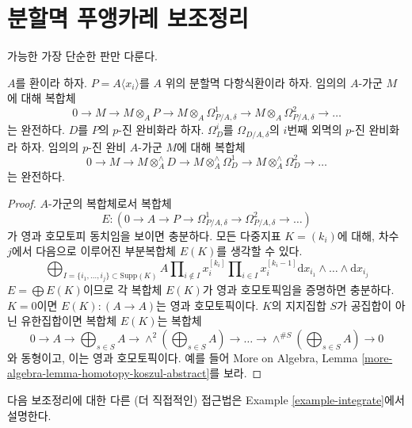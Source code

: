 \section{분할멱 푸앵카레 보조정리}
\label{section-poincare}

\noindent
가능한 가장 단순한 판만 다룬다.

\begin{lemma}
\label{lemma-poincare}
$A$를 환이라 하자. $P = A\langle x_i \rangle$를 $A$ 위의 분할멱
다항식환이라 하자. 임의의 $A$-가군 $M$에 대해 복합체
$$
0 \to M \to
M \otimes_A P \to
M \otimes_A \Omega^1_{P/A, \delta} \to
M \otimes_A \Omega^2_{P/A, \delta} \to \ldots
$$
는 완전하다. $D$를 $P$의 $p$-진 완비화라 하자.
$\Omega^i_D$를 $\Omega_{D/A, \delta}$의 $i$번째 외멱의 $p$-진
완비화라 하자. 임의의 $p$-진 완비 $A$-가군 $M$에 대해 복합체
$$
0 \to M \to
M \otimes^\wedge_A D \to
M \otimes^\wedge_A \Omega^1_D \to
M \otimes^\wedge_A \Omega^2_D \to \ldots
$$
는 완전하다.
\end{lemma}

\begin{proof}
$A$-가군의 복합체로서 복합체
$$
E :
(0 \to A \to P \to \Omega^1_{P/A, \delta} \to
\Omega^2_{P/A, \delta} \to \ldots)
$$
가 영과 호모토피 동치임을 보이면 충분하다. 모든 다중지표
$K = (k_i)$에 대해, 차수 $j$에서 다음으로 이루어진 부분복합체
$E(K)$를 생각할 수 있다.
$$
\bigoplus\nolimits_{I = \{i_1, \ldots, i_j\} \subset \text{Supp}(K)}
A
\prod\nolimits_{i \not \in I} x_i^{[k_i]}
\prod\nolimits_{i \in I} x_i^{[k_i - 1]}
\text{d}x_{i_1} \wedge \ldots \wedge \text{d}x_{i_j}
$$
$E = \bigoplus E(K)$이므로 각 복합체 $E(K)$가 영과 호모토픽임을
증명하면 충분하다. $K = 0$이면 $E(K) : (A \to A)$는 영과
호모토픽이다. $K$의 지지집합 $S$가 공집합이 아닌 유한집합이면
복합체 $E(K)$는 복합체
$$
0 \to A \to
\bigoplus\nolimits_{s \in S} A \to
\wedge^2(\bigoplus\nolimits_{s \in S} A) \to
\ldots \to \wedge^{\# S}(\bigoplus\nolimits_{s \in S} A) \to 0
$$
와 동형이고, 이는 영과 호모토픽이다. 예를 들어 More on Algebra,
Lemma \ref{more-algebra-lemma-homotopy-koszul-abstract}를 보라.
\end{proof}

\noindent
다음 보조정리에 대한 다른 (더 직접적인) 접근법은 Example
\ref{example-integrate}에서 설명한다.

